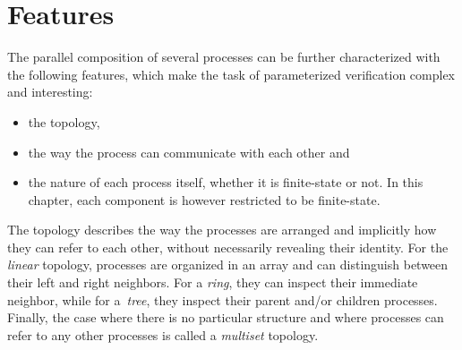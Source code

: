 \section{Features}
\label{section:paramsys:features}
%
%
% 
The parallel composition of several processes can be further
characterized with the following features, which make the task of
parameterized verification complex and interesting: %
\begin{itemize}
\item %
  the topology,
\item %
  the way the process can communicate with each other and
\item {}%
  the nature of each process itself, whether it is finite-state or
  not. In this chapter, %
  each component is however restricted to be finite-state. %
\end{itemize}

\smallskip
%
%
%
%
%
%
The topology describes the way the processes are arranged and
implicitly how they can refer to each other, without necessarily
revealing their identity. %
% 
For the \emph{linear} topology, processes are organized in an array
and can distinguish between %
their left and right neighbors. %
For a \emph{ring}, they can inspect their immediate neighbor, while
for a~\emph{tree}, they inspect their parent and/or children
processes. %
Finally, the case where there is no particular structure and where
processes can refer to any other processes is called a \emph{multiset}
topology.
 
